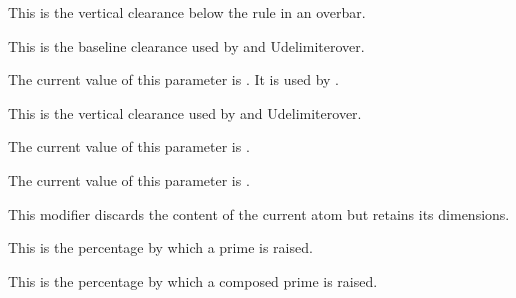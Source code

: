 \stopnewprimitive

\startnewprimitive[title={\prm {Umathoverbarvgap}}]

This is the vertical clearance below the rule in an overbar.

\stopnewprimitive

\startnewprimitive[title={\prm {Umathoverdelimiterbgap}}]

This is the baseline clearance used by  and \prm
{Udelimiterover}.

\stopnewprimitive

\startnewprimitive[title={\prm {Umathoverdelimitervariant}}]

The current value of this parameter is \CurrentMathVariant
\Umathoverdelimitervariant. It is used by .

\stopnewprimitive

\startnewprimitive[title={\prm {Umathoverdelimitervgap}}]

This is the vertical clearance used by  and \prm
{Udelimiterover}.

\stopnewprimitive

\startnewprimitive[title={\prm {Umathoverlayaccentvariant}}]

The current value of this parameter is \CurrentMathVariant
\Umathoverlayaccentvariant.

\stopnewprimitive

\startnewprimitive[title={\prm {Umathoverlinevariant}}]

The current value of this parameter is \CurrentMathVariant \Umathoverlinevariant.

\stopnewprimitive

\startnewprimitive[title={\prm {Umathphantom}}]

This modifier discards the content of the current atom but retains its
dimensions.

\stopnewprimitive

\startnewprimitive[title={\prm {Umathprimeraise}}]

This is the percentage by which a prime is raised.

\stopnewprimitive

\startnewprimitive[title={\prm {Umathprimeraisecomposed}}]

This is the percentage by which a composed prime is raised.

\stopnewprimitive

\startnewprimitive[title={\prm {Umathprimeshiftdrop}}]

